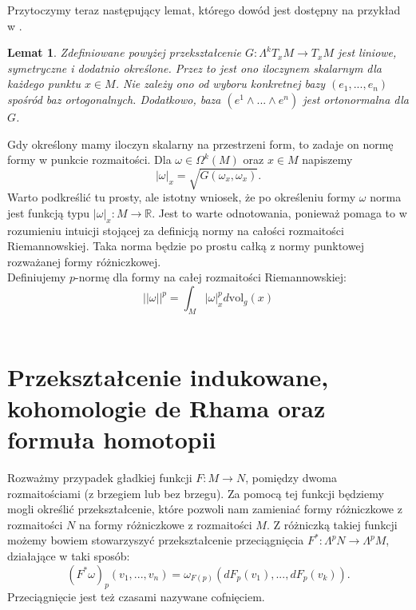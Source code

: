 \documentclass[licencjacka]{pracamgr}
\theoremstyle{definition}
\theoremstyle{definition}
\theoremstyle{plain}
\newtheorem{lemma}{Lemat}[section]
\theoremstyle{plain}
\theoremstyle{plain}
\theoremstyle{plain}
\begin{document}
Przytoczymy teraz następujący lemat, którego dowód jest dostępny na przykład
 w \cite{lausanne}.

\begin{lemma}
    Zdefiniowane powyżej przekształcenie $G: \Lambda^k T_x M \rightarrow T_x M $ 
    jest liniowe, symetryczne i dodatnio określone. Przez to jest ono iloczynem
    skalarnym dla każdego punktu $x \in M$.  Nie zależy ono od wyboru konkretnej bazy
    $(e_1, ..., e_n)$ spośród baz ortogonalnych.  Dodatkowo, baza
    $(e^1 \wedge ... \wedge e^n)$ jest ortonormalna dla $G$.
\end{lemma}



Gdy określony mamy iloczyn skalarny na przestrzeni form, to zadaje on 
normę formy w punkcie rozmaitości. Dla $\omega \in \Omega^k(M)$ oraz $x \in M$
napiszemy
\[
    |\omega|_x = \sqrt{ G(\omega_x, \omega_x) }.
\]
Warto podkreślić tu prosty, ale istotny wniosek, że po określeniu formy $\omega$
norma jest funkcją typu $| \omega |_x : M \rightarrow \mathbb{R} $. Jest to warte
odnotowania, ponieważ pomaga to w rozumieniu intuicji stojącej za definicją normy
na całości rozmaitości Riemannowskiej. Taka norma będzie po prostu całką 
z normy punktowej rozważanej formy różniczkowej. \\

Definiujemy $p$-normę dla formy na całej rozmaitości Riemannowskiej:
\begin{equation} \label{big-norm}
  || \omega ||^p =  \int_M |\omega|_x^p d \text{vol}_g(x)
\end{equation} \\



\section{Przekształcenie indukowane, kohomologie de Rhama oraz formuła homotopii}
Rozważmy przypadek gładkiej funkcji $F: M \rightarrow N$, pomiędzy
dwoma rozmaitościami (z brzegiem lub bez brzegu). Za pomocą tej
funkcji będziemy mogli określić przekształcenie, które pozwoli nam
zamieniać formy różniczkowe z rozmaitości $N$ na formy różniczkowe z
rozmaitości $M$. Z różniczką takiej funkcji możemy bowiem stowarzyszyć
przekształcenie
przeciągnięcia $F^\ast: \Lambda^p N \rightarrow \Lambda^p M$, działające w taki sposób:
\[
    (F^\ast \omega)_p(v_1, ..., v_n) =
        \omega_{F(p)}(dF_p(v_1), ..., dF_p(v_k)).
\] Przeciągnięcie jest też czasami nazywane cofnięciem. \\
\end{document}
